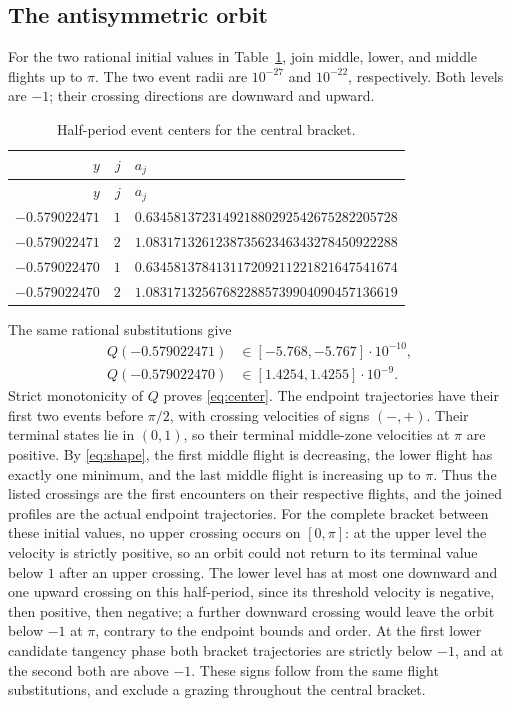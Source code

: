 \documentclass[11pt,a4paper]{article}
\begin{document}
\subsection{The antisymmetric orbit}\label{app:center}
For the two rational initial values in Table~\ref{tab:center-events},
join middle, lower, and middle flights up to $\pi$. The two event
radii are $10^{-27}$ and $10^{-22}$, respectively. Both levels are $-1$;
their crossing directions are downward and upward.
{\small
\begin{longtable}{@{}rrl@{}}
\caption{Half-period event centers for the central bracket.}\label{tab:center-events}\\
\toprule $y$ & $j$ & $a_j$\\\midrule\endfirsthead
\toprule $y$ & $j$ & $a_j$\\\midrule\endhead
$-0.579022471$ & $1$ & $0.634581372314921880292542675282205728$\\
$-0.579022471$ & $2$ & $1.083171326123873562346343278450922288$\\
$-0.579022470$ & $1$ & $0.634581378413117209211221821647541674$\\
$-0.579022470$ & $2$ & $1.083171325676822885739904090457136619$\\
\bottomrule\end{longtable}}
The same rational substitutions give
\begin{align*}
 Q(-0.579022471)&\in[-5.768,-5.767]\cdot10^{-10},\\
 Q(-0.579022470)&\in[1.4254,1.4255]\cdot10^{-9}.
\end{align*}
Strict monotonicity of $Q$ proves \eqref{eq:center}.
The endpoint trajectories have their first two events before $\pi/2$,
with crossing velocities of signs $(-,+)$. Their terminal states lie
in $(0,1)$, so their terminal middle-zone velocities at $\pi$ are positive.
By \eqref{eq:shape}, the first middle flight is decreasing, the lower
flight has exactly one minimum, and the last middle flight is increasing
up to $\pi$. Thus the listed crossings are the first encounters on
their respective flights, and the joined profiles are the actual
endpoint trajectories.
For the complete bracket between these initial values, no upper crossing
occurs on $[0,\pi]$: at the upper level the velocity is strictly positive,
so an orbit could not return to its terminal value below $1$ after an
upper crossing. The lower level has at most one downward and one upward
crossing on this half-period, since its threshold velocity is negative,
then positive, then negative; a further downward crossing would leave
the orbit below $-1$ at $\pi$, contrary to the endpoint bounds and order.
At the first lower candidate tangency phase both bracket trajectories
are strictly below $-1$, and at the second both are above $-1$.
These signs follow from the same flight substitutions, and exclude a
grazing throughout the central bracket.
\end{document}
